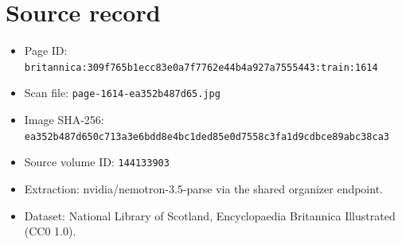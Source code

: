 \documentclass{article}
\begin{document}
\section*{Source record}
\begin{itemize}
\item Page ID: \texttt{britannica:309f765b1ecc83e0a7f7762e44b4a927a7555443:train:1614}
\item Scan file: \texttt{page-1614-ea352b487d65.jpg}
\item Image SHA-256: \texttt{ea352b487d650c713a3e6bdd8e4bc1ded85e0d7558c3fa1d9cdbce89abc38ca3}
\item Source volume ID: \texttt{144133903}
\item Extraction: nvidia/nemotron-3.5-parse via the shared organizer endpoint.
\item Dataset: National Library of Scotland, Encyclopaedia Britannica Illustrated (CC0 1.0).
\end{itemize}
\end{document}
